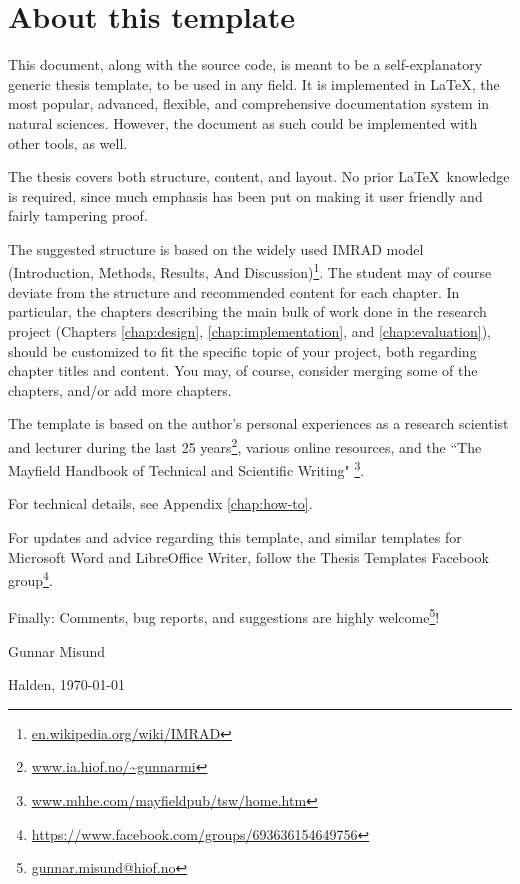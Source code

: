 \chapter*{About this template}
\label{chap:about}

This document, along with the source code, is meant to be a self-explanatory generic thesis template, to be used in any field. It is implemented in \LaTeX, the most popular, advanced, flexible, and comprehensive documentation system in natural sciences. However, the document as such could be implemented with other tools, as well.

The thesis covers both structure, content, and layout. No prior \LaTeX\ knowledge is required, since much emphasis has been put on making it user friendly and fairly tampering proof.

The suggested structure is based on the widely used IMRAD model (Introduction, Methods, Results, And Discussion)\footnote{\url{en.wikipedia.org/wiki/IMRAD}}. The student may of course deviate from the structure and recommended content for each chapter. In particular, the chapters describing the main bulk of work done in the research project (Chapters \ref{chap:design}, \ref{chap:implementation}, and \ref{chap:evaluation}), should be customized to fit the specific topic of your project, both regarding chapter titles and content. You may, of course, consider merging some of the chapters, and/or add more chapters.

The template is based on the author's personal experiences as a research scientist and lecturer during the last 25 years\footnote{\url{www.ia.hiof.no/~gunnarmi}}, various online resources, 
and the ``The Mayfield Handbook of Technical and Scientific Writing"  \cite{perelman97mht}\footnote{\url{www.mhhe.com/mayfieldpub/tsw/home.htm}}.

For technical details, see Appendix \ref{chap:how-to}.

For updates and advice regarding this template, and similar templates for Microsoft Word and LibreOffice Writer, follow the Thesis Templates Facebook group\footnote{\url{https://www.facebook.com/groups/693636154649756}}.

Finally: Comments, bug reports, and suggestions are highly welcome\footnote{\url{gunnar.misund@hiof.no}}!

\vspace{20mm}

Gunnar Misund

Halden, \today





